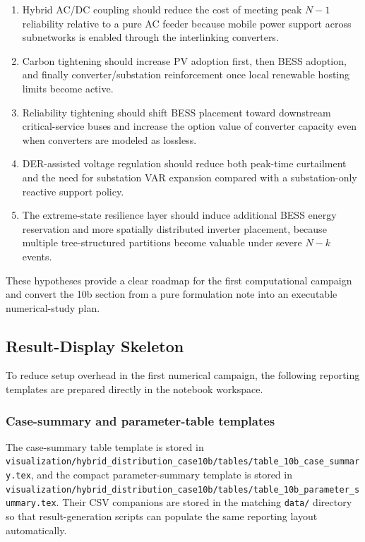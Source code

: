 \begin{enumerate}
  \item Hybrid AC/DC coupling should reduce the cost of meeting peak \(N{-}1\) reliability relative to a pure AC feeder because mobile power support across subnetworks is enabled through the interlinking converters.
  \item Carbon tightening should increase PV adoption first, then BESS adoption, and finally converter/substation reinforcement once local renewable hosting limits become active.
  \item Reliability tightening should shift BESS placement toward downstream critical-service buses and increase the option value of converter capacity even when converters are modeled as lossless.
  \item DER-assisted voltage regulation should reduce both peak-time curtailment and the need for substation VAR expansion compared with a substation-only reactive support policy.
  \item The extreme-state resilience layer should induce additional BESS energy reservation and more spatially distributed inverter placement, because multiple tree-structured partitions become valuable under severe \(N{-}k\) events.
\end{enumerate}

These hypotheses provide a clear roadmap for the first computational campaign and convert the 10b section from a pure formulation note into an executable numerical-study plan.

\subsection{Result-Display Skeleton}

To reduce setup overhead in the first numerical campaign, the following reporting templates are prepared directly in the notebook workspace.

\subsubsection{Case-summary and parameter-table templates}

The case-summary table template is stored in
\texttt{visualization/hybrid\_distribution\_case10b/tables/table\_10b\_case\_summary.tex}, and the compact parameter-summary template is stored in
\texttt{visualization/hybrid\_distribution\_case10b/tables/table\_10b\_parameter\_summary.tex}. Their CSV companions are stored in the matching \texttt{data/} directory so that result-generation scripts can populate the same reporting layout automatically.

